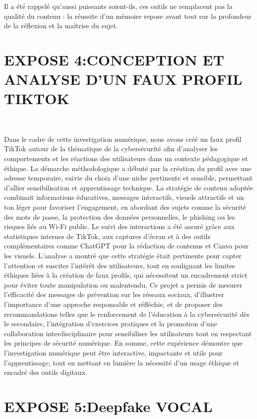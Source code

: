 \documentclass[12pt,a4paper]{report}
\begin{document}
{	Il a été rappelé qu’aussi puissants soient-ils, ces outils ne remplacent pas la qualité du contenu : la réussite d’un mémoire repose avant tout sur la profondeur de la réflexion et la maîtrise du sujet.
	
	
	\section*{EXPOSE 4:CONCEPTION ET ANALYSE D'UN FAUX PROFIL TIKTOK}\
	
	
	Dans le cadre de cette investigation numérique, nous avons créé un faux profil TikTok autour de la thématique de la cybersécurité afin d’analyser les comportements et les réactions des utilisateurs dans un contexte pédagogique et éthique. La démarche méthodologique a débuté par la création du profil avec une adresse temporaire, suivie du choix d’une niche pertinente et sensible, permettant d’allier sensibilisation et apprentissage technique. La stratégie de contenu adoptée combinait informations éducatives, messages interactifs, visuels attractifs et un ton léger pour favoriser l’engagement, en abordant des sujets comme la sécurité des mots de passe, la protection des données personnelles, le phishing ou les risques liés au Wi-Fi public. Le suivi des interactions a été assuré grâce aux statistiques internes de TikTok, aux captures d’écran et à des outils complémentaires comme ChatGPT pour la rédaction de contenus et Canva pour les visuels. L’analyse a montré que cette stratégie était pertinente pour capter l’attention et susciter l’intérêt des utilisateurs, tout en soulignant les limites éthiques liées à la création de faux profils, qui nécessitent un encadrement strict pour éviter toute manipulation ou malentendu. Ce projet a permis de mesurer l’efficacité des messages de prévention sur les réseaux sociaux, d’illustrer l’importance d’une approche responsable et réfléchie, et de proposer des recommandations telles que le renforcement de l’éducation à la cybersécurité dès le secondaire, l’intégration d’exercices pratiques et la promotion d’une collaboration interdisciplinaire pour sensibiliser les utilisateurs tout en respectant les principes de sécurité numérique. En somme, cette expérience démontre que l’investigation numérique peut être interactive, impactante et utile pour l’apprentissage, tout en mettant en lumière la nécessité d’un usage éthique et encadré des outils digitaux.
	
	\section*{EXPOSE 5:Deepfake VOCAL}\

}
\end{document}
